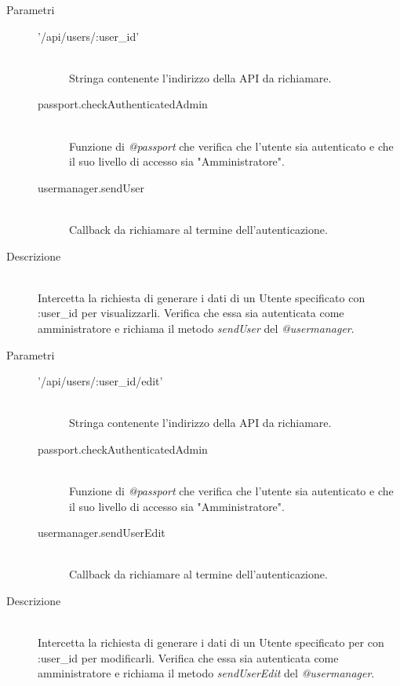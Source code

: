 \begin{description}
\begin{description}
\begin{mldescription}
     \hfill
    \begin{description}
    \item[Parametri] \hfill
     \begin{description}
      \item['/api/users/:user\_id'] \hfill \\
      Stringa contenente l'indirizzo della API da richiamare.
      \item[passport.checkAuthenticatedAdmin] \hfill \\
      Funzione di \textit{@passport} che verifica che l'utente sia autenticato e che il suo livello di accesso sia "Amministratore".
      \item[usermanager.sendUser] \hfill \\
      Callback da richiamare al termine dell'autenticazione.
     \end{description}
    \item[Descrizione] \hfill \\
    Intercetta la richiesta di generare i dati di un Utente specificato con :user\_id per visualizzarli. Verifica che essa sia autenticata come amministratore e richiama il metodo \textit{sendUser} del \textit{@usermanager}.
    \end{description} 
    
     \hfill 
    \begin{description}
    \item[Parametri] \hfill
     \begin{description}
      \item['/api/users/:user\_id/edit'] \hfill \\
      Stringa contenente l'indirizzo della API da richiamare.
      \item[passport.checkAuthenticatedAdmin] \hfill \\
      Funzione di \textit{@passport} che verifica che l'utente sia autenticato e che il suo livello di accesso sia "Amministratore".
      \item[usermanager.sendUserEdit] \hfill \\
      Callback da richiamare al termine dell'autenticazione.
     \end{description}
    \item[Descrizione] \hfill \\
    Intercetta la richiesta di generare i dati di un Utente specificato per con :user\_id per modificarli. Verifica che essa sia autenticata come amministratore e richiama il metodo \textit{sendUserEdit} del \textit{@usermanager}.
    \end{description} 
    

\end{mldescription}
\end{description}
\end{description}
